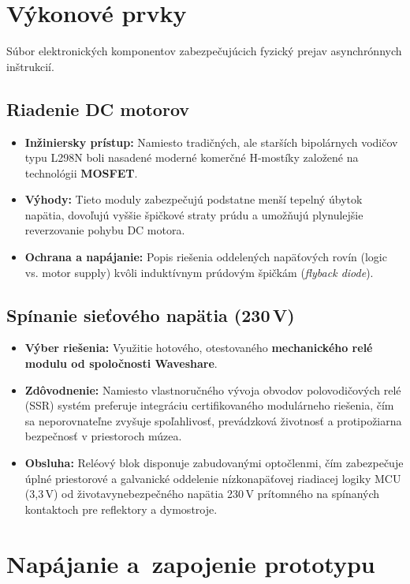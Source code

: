 \section{Výkonové prvky}
\label{VykonovePrvky}

Súbor elektronických komponentov zabezpečujúcich fyzický prejav asynchrónnych inštrukcií.

\subsection{Riadenie DC motorov}
\begin{itemize}
    \item \textbf{Inžiniersky prístup:} Namiesto tradičných, ale starších bipolárnych vodičov typu L298N boli nasadené moderné komerčné H-mostíky založené na technológii \textbf{MOSFET}.
    \item \textbf{Výhody:} Tieto moduly zabezpečujú podstatne menší tepelný úbytok napätia, dovoľujú vyššie špičkové straty prúdu a umožňujú plynulejšie reverzovanie pohybu DC motora.
    \item \textbf{Ochrana a napájanie:} Popis riešenia oddelených napäťových rovín (logic vs. motor supply) kvôli induktívnym prúdovým špičkám (\textit{flyback diode}).
\end{itemize}

\subsection{Spínanie sieťového napätia (230\,V)}
\begin{itemize}
    \item \textbf{Výber riešenia:} Využitie hotového, otestovaného \textbf{mechanického relé modulu od spoločnosti Waveshare}. 
    \item \textbf{Zdôvodnenie:} Namiesto vlastnoručného vývoja obvodov polovodičových relé (SSR) systém preferuje integráciu certifikovaného modulárneho riešenia, čím sa neporovnateľne zvyšuje spoľahlivosť, prevádzková životnosť a protipožiarna bezpečnosť v priestoroch múzea.
    \item \textbf{Obsluha:} Reléový blok disponuje zabudovanými optočlenmi, čím zabezpečuje úplné priestorové a galvanické oddelenie nízkonapäťovej riadiacej logiky MCU (3,3\,V) od životavynebezpečného napätia 230\,V prítomného na spínaných kontaktoch pre reflektory a dymostroje.
\end{itemize}

\section{Napájanie a~zapojenie prototypu}
\label{NapajanieZapojenie}

